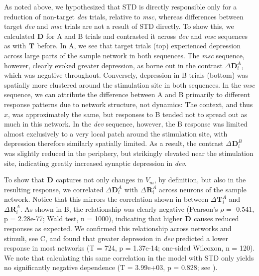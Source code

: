 \documentclass[9pt,lineno,onehalfspacing]{elife}
\newcommand{\dev}{\textit{dev}}
\newcommand{\msc}{\textit{msc}}
\newcommand{\R}[3][]{{}^{#1}_{}\boldsymbol R^{#2}_{#3}}
\newcommand{\T}[3][]{{}^{#1}_{}\boldsymbol T^{#2}_{#3}}
\newcommand{\D}[3][]{{}^{#1}_{}\boldsymbol D^{#2}_{#3}}
\begin{document}
As noted above, we hypothesized that STD is directly responsible only for a reduction of non-target \dev{} trials, relative to \msc{}, whereas differences between target \dev{} and \msc{} trials are not a result of STD directly. To show this, we calculated $\D{}{}$ for A and B trials and contrasted it across \dev{} and \msc{} sequences as with $\T{}{}$ before.
In A, we see that target trials (top) experienced depression across large parts of the sample network in both sequences. The \msc{} sequence, however, clearly evoked greater depression, as borne out in the contrast $\Delta \D{A}{i}$, which was negative throughout. Conversely, depression in B trials (bottom) was spatially more clustered around the stimulation site in both sequences. In the \msc{} sequence, we can attribute the difference between A and B primarily to different response patterns due to network structure, not dynamics: The context, and thus $x$, was approximately the same, but responses to B tended not to spread out as much in this network. In the \dev{} sequence, however, the B response was limited almost exclusively to a very local patch around the stimulation site, with depression therefore similarly spatially limited. As a result, the contrast $\Delta \D{B}{i}$ was slightly reduced in the periphery, but strikingly elevated near the stimulation site, indicating greatly increased synaptic depression in \dev{}.

To show that $\D{}{}$ captures not only changes in $V_m$, by definition, but also in the resulting response, we correlated $\Delta \D{A}{i}$ with $\Delta \R{A}{i}$ across neurons of the sample network. Notice that this mirrors the correlation shown in  between $\Delta \T{A}{i}$ and $\Delta \R{A}{i}$. As shown in B, the relationship was clearly negative (Pearson's $\rho$ = -0.541, p = 2.28e-77; Wald test, n = 1000), indicating that higher $\D{}{}$ causes reduced responses as expected. We confirmed this relationship across networks and stimuli, see C, and found that greater depression in \dev{} predicted a lower response in most networks (T = 724, p = 1.37e-14; one-sided Wilcoxon, n = 120). We note that calculating this same correlation in the model with STD only yields no significantly negative dependence (T = 3.99e+03, p = 0.828; see ).
\end{document}
